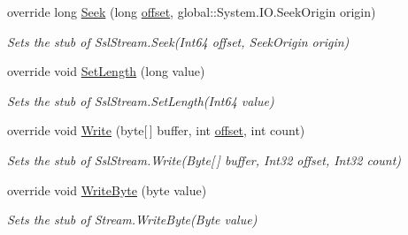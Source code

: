 \begin{DoxyCompactItemize}
override long \hyperlink{class_system_1_1_net_1_1_security_1_1_fakes_1_1_stub_ssl_stream_a53d03630ffe688238f3a3db5000e80e9}{Seek} (long \hyperlink{jquery-1_810_82_8js_a4a9f594d20d927164551fc7fa4751a2f}{offset}, global\-::\-System.\-I\-O.\-Seek\-Origin origin)
\begin{DoxyCompactList}\small\item\em Sets the stub of Ssl\-Stream.\-Seek(\-Int64 offset, Seek\-Origin origin)\end{DoxyCompactList}\item 
override void \hyperlink{class_system_1_1_net_1_1_security_1_1_fakes_1_1_stub_ssl_stream_a42086c747a56eb5e42bd8d28119d0c4a}{Set\-Length} (long value)
\begin{DoxyCompactList}\small\item\em Sets the stub of Ssl\-Stream.\-Set\-Length(\-Int64 value)\end{DoxyCompactList}\item 
override void \hyperlink{class_system_1_1_net_1_1_security_1_1_fakes_1_1_stub_ssl_stream_a97258bcd36b475f6eaa3775f64f32987}{Write} (byte\mbox{[}$\,$\mbox{]} buffer, int \hyperlink{jquery-1_810_82_8js_a4a9f594d20d927164551fc7fa4751a2f}{offset}, int count)
\begin{DoxyCompactList}\small\item\em Sets the stub of Ssl\-Stream.\-Write(\-Byte\mbox{[}$\,$\mbox{]} buffer, Int32 offset, Int32 count)\end{DoxyCompactList}\item 
override void \hyperlink{class_system_1_1_net_1_1_security_1_1_fakes_1_1_stub_ssl_stream_aab4e2ae426ffa745811852ba7b633ad8}{Write\-Byte} (byte value)
\begin{DoxyCompactList}\small\item\em Sets the stub of Stream.\-Write\-Byte(\-Byte value)\end{DoxyCompactList}\end{DoxyCompactItemize}

